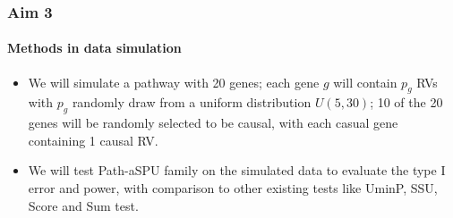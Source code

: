 \documentclass[compress]{beamer}
\begin{document}
\begin{frame}[allowframebreaks]
\frametitle{Aim 3}
\framesubtitle{Methods in data simulation}
\small
\begin{itemize}


\item We will simulate a pathway with 20 genes; each gene $g$ will contain $p_g$ RVs with $p_g$ randomly draw from a uniform distribution $U(5,30)$; 10 of the 20 genes will be randomly selected to be causal, with each casual gene containing 1 causal RV. 

\item We will test Path-aSPU family on the simulated data to evaluate the type I error and power, with comparison to other existing tests like UminP, SSU, Score and Sum test.

\end{itemize}
\end{frame}
\end{document}
